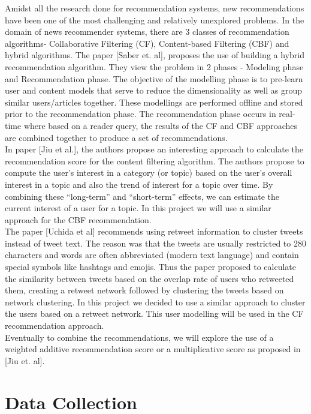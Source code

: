 \documentclass{article}
\begin{document}
Amidst all the research done for recommendation systems, new recommendations have been one of the most challenging and relatively unexplored problems. In the domain of news recommender systems, there are 3 classes of recommendation algorithms- Collaborative Filtering (CF), Content-based Filtering (CBF) and hybrid algorithms. The paper [Saber et. al], proposes the use of building a hybrid recommendation algorithm. They view the problem in 2 phases - Modeling phase and Recommendation phase. The objective of the modelling phase is to pre-learn user and content models that serve to reduce the dimensionality as well as group similar users/articles together. These modellings are performed offline and stored prior to the recommendation phase. The recommendation phase occurs in real-time where based on a reader query, the results of the CF and CBF approaches are combined together to produce a set of recommendations. \\  
In paper [Jiu et al.], the authors propose an interesting approach to calculate the recommendation score for the content filtering algorithm. The authors propose to compute the user’s interest in a category (or topic) based on the user’s overall interest in a topic and also the trend of interest for a topic over time. By combining these “long-term” and “short-term” effects, we can estimate the current interest of a user for a topic. In this project we will use a similar approach for the CBF recommendation. \\
The paper [Uchida et al] recommends using retweet information to cluster tweets instead of tweet text. The reason was that the tweets are usually restricted to 280 characters and words are often abbreviated (modern text language) and contain special symbols like hashtags and emojis. Thus the paper proposed to calculate the similarity between tweets based on the overlap rate of users who retweeted them, creating a retweet network followed by clustering the tweets based on network clustering.  In this project we decided to use a similar approach to cluster the users based on a retweet network. This user modelling will be used in the CF recommendation approach. \\
Eventually to combine the recommendations, we will explore the use of a weighted additive recommendation score or a multiplicative score as proposed in [Jiu et. al].

\section{Data Collection}
\end{document}

